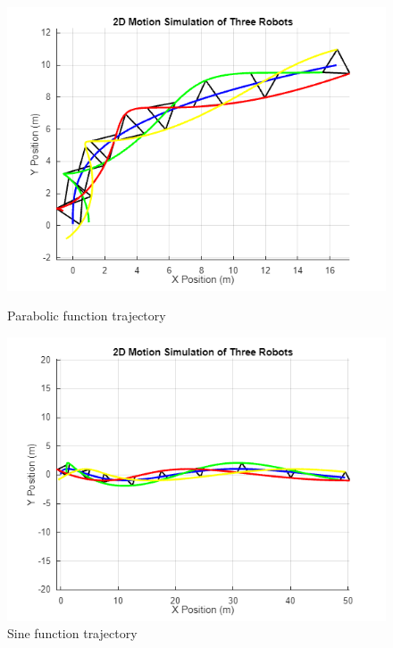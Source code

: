 \begin{figure}[!htb]
        \includegraphics[width=\linewidth]{assets/images/coordination/parabolic.png}
        \caption{Parabolic function trajectory}
    \endminipage\hfill
        \includegraphics[width=\linewidth]{assets/images/coordination/sine.png}
        \caption{Sine function trajectory}
    \endminipage
\end{figure}
